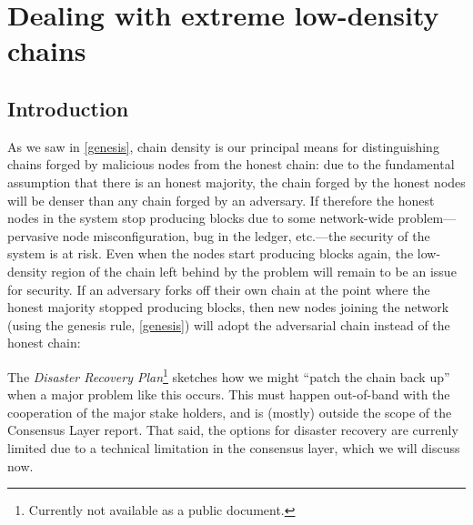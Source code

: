 \chapter{Dealing with extreme low-density chains}
\label{low-density}

\section{Introduction}

As we saw in \cref{genesis}, chain density is our principal means for
distinguishing chains forged by malicious nodes from the honest chain: due to
the fundamental assumption that there is an honest majority, the chain forged by
the honest nodes will be denser than any chain forged by an adversary. If
therefore the honest nodes in the system stop producing blocks due to some
network-wide problem---pervasive node misconfiguration, bug in the ledger,
etc.---the security of the system is at risk. Even when the nodes start
producing blocks again, the low-density region of the chain left behind by the
problem will remain to be an issue for security. If an adversary forks off
their own chain at the point where the honest majority stopped producing blocks,
then new nodes joining the network (using the genesis rule, \cref{genesis}) will
adopt the adversarial chain instead of the honest chain:
%
\begin{center}
\end{center}
%
The \emph{Disaster Recovery Plan}\footnote{Currently not available as a public
document.} sketches how we might ``patch the chain back up'' when a major
problem like this occurs. This must happen out-of-band with the cooperation of
the major stake holders, and is (mostly) outside the scope of the Consensus
Layer report. That said, the options for disaster recovery are currenly limited
due to a technical limitation in the consensus layer, which we will discuss now.

